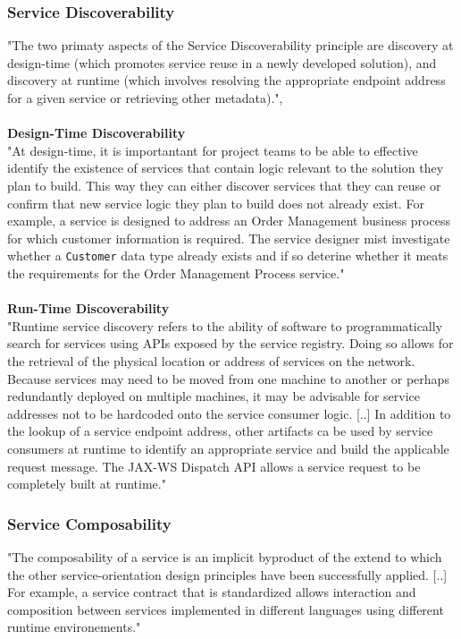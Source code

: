 \documentclass[12pt]{article}
\begin{document}
\subsubsection{Service Discoverability}
"The two primaty aspects of the Service Discoverability principle are discovery at design-time (which promotes service reuse in a newly developed solution), and discovery at runtime (which involves resolving the appropriate endpoint address for a given service or retrieving other metadata).", \cite[page 204]{grau}\\\\
\textbf{Design-Time Discoverability}\\
"At design-time, it is importantant for project teams to be able to effective identify the existence of services that contain logic relevant to the solution they plan to build. This way they can either discover services that they can reuse or confirm that new service logic they plan to build does not already exist. For example, a service is designed to address an Order Management business process for which customer information is required. The service designer mist investigate whether a \texttt{Customer} data type already exists and if so deterine whether it meats the requirements for the Order Management Process service." \cite[page 204-205]{grau}\\\\
\textbf{Run-Time Discoverability}\\
"Runtime service discovery refers to the ability of software to programmatically search for services using APIs exposed by the service registry. Doing so allows for the retrieval of the physical location or address of services on the network. Because services may need to be moved from one machine to another or perhaps redundantly deployed on multiple machines, it may be advisable for service addresses not to be hardcoded onto the service consumer logic. [..] In addition to the lookup of a service endpoint address, other artifacts ca be used by service consumers at runtime to identify an appropriate service and build the applicable request message. The JAX-WS Dispatch API allows a service request to be completely built at runtime."\cite[page 205-207]{grau}
\subsubsection{Service Composability} 
"The composability of a service is an implicit byproduct of the extend to which the other service-orientation design principles have been successfully applied. [..] For example, a service contract that is standardized allows interaction and composition between services implemented in different languages using different runtime environements."\cite[page 189]{grau}
\end{document}
